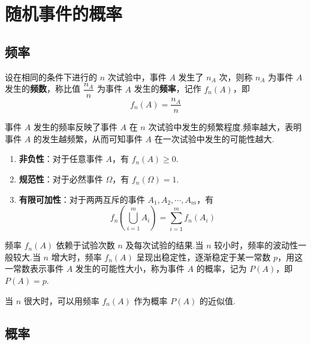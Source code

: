 \section{随机事件的概率}

\subsection{频率}

\begin{definition}
    \indent 设在相同的条件下进行的 $n$ 次试验中，事件 $A$ 发生了 $n_A$ 次，则称 $n_A$ 为事件 $A$ 发生的\textbf{频数}，称比值 $\dfrac{n_A}{n}$ 为事件 $A$ 发生的\textbf{频率}，记作 $f_n(A)$，即
    $$
    f_n(A)=\dfrac{n_A}{n}
    $$
\end{definition}

事件 $A$ 发生的频率反映了事件 $A$ 在 $n$ 次试验中发生的频繁程度.频率越大，表明事件 $A$ 的发生越频繁，从而可知事件 $A$ 在一次试验中发生的可能性越大.

\begin{property}[][频率的基本性质]
    \begin{enumerate}
        \item \textbf{非负性}：对于任意事件 $A$，有 $f_n(A) \geqslant 0$.
        \item \textbf{规范性}：对于必然事件 $\varOmega$，有 $f_n(\varOmega)=1$.
        \item \textbf{有限可加性}：对于两两互斥的事件 $A_1,A_2,\cdots,A_m$，有
        $$
        f_n \left(\bigcup_{i=1}^m A_i \right) = \sum_{i=1}^m f_n(A_i)
        $$
    \end{enumerate}
\end{property}

频率 $f_n(A)$ 依赖于试验次数 $n$ 及每次试验的结果.当 $n$ 较小时，频率的波动性一般较大.当 $n$ 增大时，频率 $f_n(A)$ 呈现出稳定性，逐渐稳定于某一常数 $p$，用这一常数表示事件 $A$ 发生的可能性大小，称为事件 $A$ 的概率，记为 $P(A)$，即 $P(A)=p$.

当 $n$ 很大时，可以用频率 $f_n(A)$ 作为概率 $P(A)$ 的近似值.

\subsection{概率}

